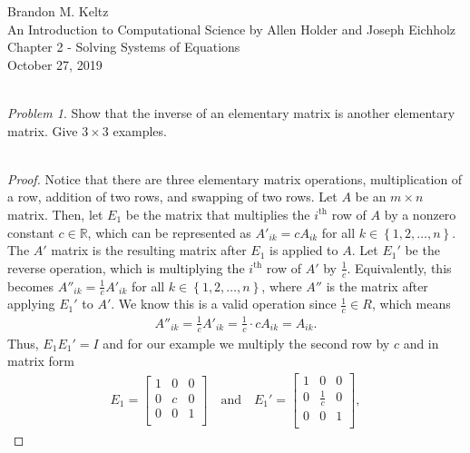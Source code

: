\documentclass{article}
\begin{document}
	\begin{flushleft}

		Brandon M. Keltz\\
		An Introduction to Computational Science by Allen Holder and Joseph Eichholz\\
		Chapter 2 - Solving Systems of Equations\\
		October 27, 2019\\\

		\textit{Problem 1}. Show that the inverse of an elementary matrix is another elementary matrix. Give $3 \times 3$ examples. \\\

		\begin{proof}

			Notice that there are three elementary matrix operations, multiplication of a row, addition of two rows, and swapping of two rows. Let $A$ be an $m \times n$ matrix. Then, let $E_1$ be the matrix that multiplies the $i^\text{th}$ row of $A$ by a nonzero constant $c \in \mathbb{R}$, which can be represented as $A'_{ik} = cA_{ik}$ for all $k \in \left\{ 1, 2, \ldots, n \right\}$. The $A'$ matrix is the resulting matrix after $E_1$ is applied to $A$. Let $E_1'$ be the reverse operation, which is multiplying the $i^\text{th}$ row of $A'$ by $\frac{1}{c}$. Equivalently, this becomes $A''_{ik} = \frac{1}{c} A'_{ik}$ for all $k \in \left\{ 1, 2, \ldots, n \right\}$, where $A''$ is the matrix after applying $E_1'$ to $A'$. We know this is a valid operation since $\frac{1}{c} \in {R}$, which means
			\begin{align*}
				A''_{ik} = \frac{1}{c} A'_{ik} = \frac{1}{c} \cdot c A_{ik} = A_{ik}.
			\end{align*}
			Thus, $E_1 E_1' = I$ and for our example we multiply the second row by $c$ and in matrix form
			\begin{align*}
				E_1 = \begin{bmatrix}
					1 & 0 & 0 \\
					0 & c & 0 \\
					0 & 0 & 1 \\
				\end{bmatrix} \quad \text{and} \quad
				E_1' = \begin{bmatrix}
					1 & 0 & 0 \\
					0 & \frac{1}{c} & 0 \\
					0 & 0 & 1 \\
				\end{bmatrix},
			\end{align*}

\end{proof}
\end{flushleft}
\end{document}
